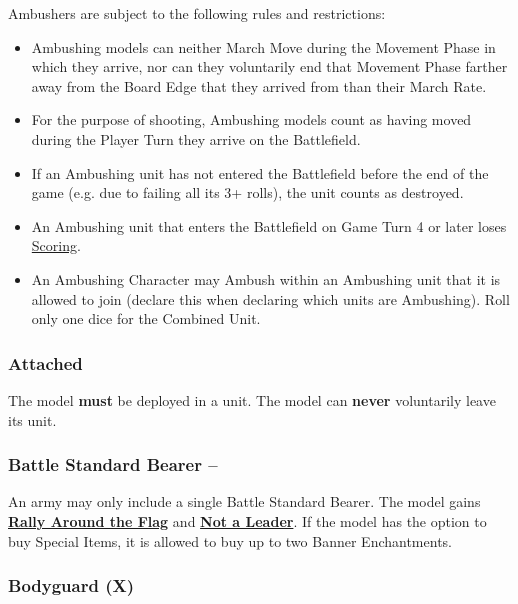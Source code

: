 Ambushers are subject to the following rules and restrictions:
\begin{itemize}
	\item Ambushing models can neither March Move during the Movement Phase in which they arrive, nor can they voluntarily end that Movement Phase farther away from the Board Edge that they arrived from than their March Rate.
	\item For the purpose of shooting, Ambushing models count as having moved during the Player Turn they arrive on the Battlefield.
	\item If an Ambushing unit has not entered the Battlefield before the end of the game (e.g. due to failing all its 3+ rolls), the unit counts as destroyed.
	\item An Ambushing unit that enters the Battlefield on Game Turn 4 or later loses \hyperref[scoring]{Scoring}.
	\item An Ambushing Character may Ambush within an Ambushing unit that it is allowed to join (declare this when declaring which units are Ambushing). Roll only one dice for the Combined Unit.
\end{itemize}

\subsubsection{Attached}
\idx[main=y]{\attached}\label{attached}

The model \textbf{must} be deployed in a unit. The model can \textbf{never} voluntarily leave its unit.

\subsubsection{Battle Standard Bearer -- \oneofakind{}}
\label{bsb}

An army may only include a single Battle Standard Bearer. The model gains \hyperref[rally_around_the_flag]{\textbf{Rally Around the Flag}} and \hyperref[not_a_leader]{\textbf{Not a Leader}}. If the model has the option to buy Special Items, it is allowed to buy up to two Banner Enchantments.

\columnbreak

\subsubsection{Bodyguard (X)}
\idx[main=y]{\bodyguard{}}\label{bodyguard}

